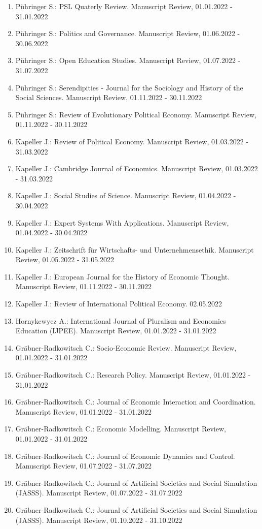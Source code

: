 \begin{enumerate}[leftmargin=*, labelsep=0.5cm]
\item Pühringer S.: PSL Quaterly Review. Manuscript Review, 01.01.2022 - 31.01.2022
\item Pühringer S.: Politics and Governance. Manuscript Review, 01.06.2022 - 30.06.2022
\item Pühringer S.: Open Education Studies. Manuscript Review, 01.07.2022 - 31.07.2022
\item Pühringer S.: Serendipities - Journal for the Sociology and History of the Social Sciences. Manuscript Review, 01.11.2022 - 30.11.2022
\item Pühringer S.: Review of Evolutionary Political Economy. Manuscript Review, 01.11.2022 - 30.11.2022
\item Kapeller J.: Review of Political Economy. Manuscript Review, 01.03.2022 - 31.03.2022
\item Kapeller J.: Cambridge Journal of Economics. Manuscript Review, 01.03.2022 - 31.03.2022
\item Kapeller J.: Social Studies of Science. Manuscript Review, 01.04.2022 - 30.04.2022
\item Kapeller J.: Expert Systems With Applications. Manuscript Review, 01.04.2022 - 30.04.2022
\item Kapeller J.: Zeitschrift für Wirtschafts- und Unternehmensethik. Manuscript Review, 01.05.2022 - 31.05.2022
\item Kapeller J.: European Journal for the History of Economic Thought. Manuscript Review, 01.11.2022 - 30.11.2022
\item Kapeller J.: Review of International Political Economy. 02.05.2022
\item Hornykewycz A.: International Journal of Pluralism and Economics Education (IJPEE). Manuscript Review, 01.01.2022 - 31.01.2022
\item Gräbner-Radkowitsch C.: Socio-Economic Review. Manuscript Review, 01.01.2022 - 31.01.2022
\item Gräbner-Radkowitsch C.: Research Policy. Manuscript Review, 01.01.2022 - 31.01.2022
\item Gräbner-Radkowitsch C.: Journal of Economic Interaction and Coordination. Manuscript Review, 01.01.2022 - 31.01.2022
\item Gräbner-Radkowitsch C.: Economic Modelling. Manuscript Review, 01.01.2022 - 31.01.2022
\item Gräbner-Radkowitsch C.: Journal of Economic Dynamics and Control. Manuscript Review, 01.07.2022 - 31.07.2022
\item Gräbner-Radkowitsch C.: Journal of Artificial Societies and Social Simulation (JASSS). Manuscript Review, 01.07.2022 - 31.07.2022
\item Gräbner-Radkowitsch C.: Journal of Artificial Societies and Social Simulation (JASSS). Manuscript Review, 01.10.2022 - 31.10.2022
\end{enumerate}
